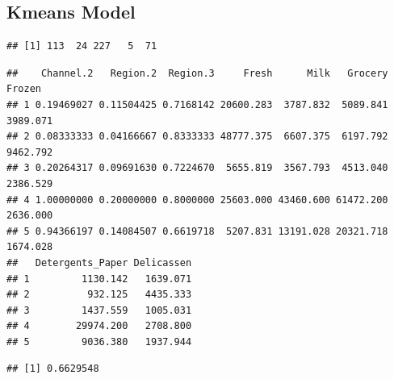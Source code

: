 \documentclass[
  english,
  man]{apa6}
\newenvironment{Shaded}{\begin{snugshade}}{\end{snugshade}}
\newcommand{\CommentTok}[1]{\textcolor[rgb]{0.56,0.35,0.01}{\textit{#1}}}
\newcommand{\DecValTok}[1]{\textcolor[rgb]{0.00,0.00,0.81}{#1}}
\newcommand{\KeywordTok}[1]{\textcolor[rgb]{0.13,0.29,0.53}{\textbf{#1}}}
\newcommand{\NormalTok}[1]{#1}
\newcommand{\OperatorTok}[1]{\textcolor[rgb]{0.81,0.36,0.00}{\textbf{#1}}}
\newcommand{\StringTok}[1]{\textcolor[rgb]{0.31,0.60,0.02}{#1}}
\begin{document}
\hypertarget{kmeans-model}{%
\subsection{Kmeans Model}\label{kmeans-model}}

\begin{Shaded}
\end{Shaded}

\begin{verbatim}
## [1] 113  24 227   5  71
\end{verbatim}

\begin{Shaded}
\end{Shaded}

\begin{verbatim}
##    Channel.2   Region.2  Region.3     Fresh      Milk   Grocery   Frozen
## 1 0.19469027 0.11504425 0.7168142 20600.283  3787.832  5089.841 3989.071
## 2 0.08333333 0.04166667 0.8333333 48777.375  6607.375  6197.792 9462.792
## 3 0.20264317 0.09691630 0.7224670  5655.819  3567.793  4513.040 2386.529
## 4 1.00000000 0.20000000 0.8000000 25603.000 43460.600 61472.200 2636.000
## 5 0.94366197 0.14084507 0.6619718  5207.831 13191.028 20321.718 1674.028
##   Detergents_Paper Delicassen
## 1         1130.142   1639.071
## 2          932.125   4435.333
## 3         1437.559   1005.031
## 4        29974.200   2708.800
## 5         9036.380   1937.944
\end{verbatim}

\begin{Shaded}
\end{Shaded}

\begin{verbatim}
## [1] 0.6629548
\end{verbatim}
\end{document}
